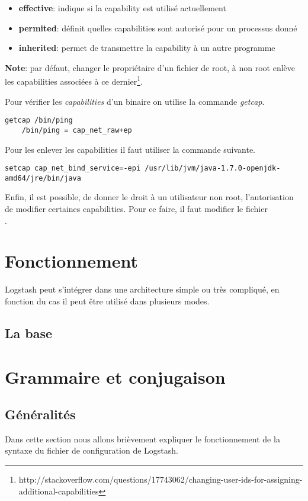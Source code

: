 \begin{itemize}
    \item \textbf{effective}: indique si la capability est utilisé actuellement
    \item \textbf{permited}: définit quelles capabilities sont autorisé pour un 
    processus donné
    \item \textbf{inherited}: permet de transmettre la capability à un autre programme
\end{itemize}
\textbf{Note}: par défaut, changer le propriétaire d'un fichier de root, à non root enlève
les capabilities associées à ce dernier\footnote{\scriptsize{http://stackoverflow.com/questions/17743062/changing-user-ids-for-assigning-additional-capabilities}}.

Pour vérifier les \textit{capabilities} d'un binaire on utilise la commande 
\emph{getcap}.

\begin{lstlisting}[style=code,label={lst:getcapabilities}]
    getcap /bin/ping
    /bin/ping = cap_net_raw+ep
\end{lstlisting}

Pour les enlever les capabilities il faut utiliser la commande suivante.
\begin{lstlisting}[style=code,label={lst:unsetcapabilities}]
setcap cap_net_bind_service=-epi /usr/lib/jvm/java-1.7.0-openjdk-amd64/jre/bin/java
\end{lstlisting}

Enfin, il est possible, de donner le droit à un utilisateur non root, l'autorisation
de modifier certaines capabilities. Pour ce faire, il faut modifier le fichier \\[1mm]
.

\section{Fonctionnement}
Logstash peut s'intégrer dans une architecture simple ou très compliqué, en fonction
du cas il peut être utilisé dans plusieurs modes.
\subsection{La base}


\section{Grammaire et conjugaison}
\subsection{Généralités}
Dans cette section nous allons brièvement expliquer le fonctionnement de la syntaxe 
du fichier de configuration de Logstash.

